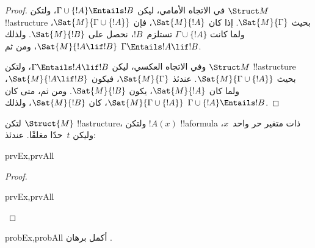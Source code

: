 \documentclass[../../../include/open-logic-section]{subfiles}
\begin{document}
\begin{proof}
في الاتجاه الأمامي، ليكن
$\Gamma \cup \{ !A \} \Entails !B$، ولتكن $\Struct M$
!!a{structure} بحيث $\Sat{M}{\Gamma}$. إذا كان $\Sat{M}{!A}$،
فإن $\Sat{M}{\Gamma \cup \{ !A \} }$، ولما كانت
$\Gamma \cup \{ !A \}$ تستلزم~$!B$، نحصل على $\Sat{M}{!B}$.
ولذلك $\Sat{M}{!A \lif !B}$، ومن ثم
$\Gamma \Entails !A \lif !B$.

وفي الاتجاه العكسي، ليكن $\Gamma \Entails !A \lif !B$، ولتكن
$\Struct M$ !!a{structure} بحيث
$\Sat{M}{\Gamma \cup \{ !A \}}$. عندئذ $\Sat{M}{\Gamma}$،
فيكون $\Sat{M}{!A \lif !B}$، ولما كان $\Sat{M}{!A}$، يكون
$\Sat{M}{!B}$. ومن ثم، متى كان
$\Sat{M}{\Gamma \cup \{ !A \} }$، كان $\Sat{M}{!B}$، ولذلك
$\Gamma \cup \{ !A \} \Entails !B$.
\end{proof}

\begin{prop}
  لتكن $\Struct{M}$ !!a{structure}، ولتكن $!A(x)$ !!a{formula} ذات
  متغير حر واحد~$x$، وليكن $t$~حدًا مغلقًا. عندئذ:
  \begin{tagenumerate}{prvEx,prvAll}
  \end{tagenumerate}
\end{prop}

\begin{proof}
  \begin{tagenumerate}{prvEx,prvAll}
  \end{tagenumerate}
\end{proof}

\begin{probtag}{probEx,probAll}
  أكمل برهان .
\end{probtag}
\end{document}
